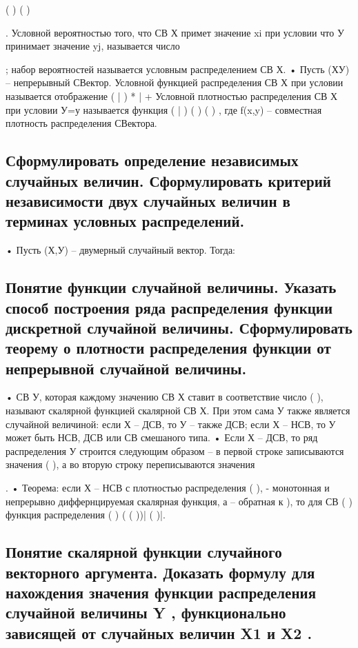 {
	
}
{( ) (
	)}
{
}



. Условной вероятностью того, что СВ Х примет значение xi при условии что У принимает
значение yj, называется число


; набор вероятностей называется условным распределением СВ Х.
• Пусть (ХУ) – непрерывный СВектор. Условной функцией распределения СВ Х при условии называется отображение
( | )
* | + Условной плотностью распределения СВ Х при условии У=у называется функция
( | )
( )
( )
, где f(x,y) – совместная
плотность распределения СВектора.

\subsection{Сформулировать определение независимых случайных величин. Сформулировать критерий независимости двух случайных величин в терминах условных распределений.}

• Пусть (Х,У) – двумерный случайный вектор. Тогда:


\subsection{Понятие функции случайной величины. Указать способ построения ряда распределения функции дискретной случайной величины. Сформулировать теорему о плотности распределения функции от непрерывной случайной величины.}

• СВ У, которая каждому значению СВ Х ставит в соответствие число ( ), называют скалярной функцией скалярной СВ Х. При этом
сама У также является случайной величиной: если Х – ДСВ, то У – также ДСВ; если Х – НСВ, то У может быть НСВ, ДСВ или СВ смешаного
типа.
• Если Х – ДСВ, то ряд распределения У строится следующим образом – в первой строке записываются значения (
), а во вторую
строку переписываются значения

.
• Теорема: если Х – НСВ с плотностью распределения
( ), - монотонная и непрерывно диффернцируемая скалярная функция, а
– обратная к ), то для СВ ( ) функция распределения
( ) ( ( ))|
( )|.

\subsection{Понятие скалярной функции случайного векторного аргумента. Доказать формулу для нахождения значения функции распределения случайной величины Y , функционально зависящей от случайных величин X1 и X2 .}

